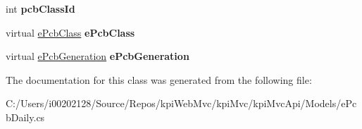 \begin{DoxyCompactItemize}
int {\bfseries pcb\+Class\+Id}
\item 
\mbox{\label{classkpi_mvc_api_1_1_models_1_1e_pcb_daily_ac1a6216b8a8446e2fcd59aa7ee06c609}} 
virtual \hyperlink{classkpi_mvc_api_1_1_models_1_1e_pcb_class}{e\+Pcb\+Class} {\bfseries e\+Pcb\+Class}
\item 
\mbox{\label{classkpi_mvc_api_1_1_models_1_1e_pcb_daily_aedba8ff244aebf2ed927ac2a49884c0e}} 
virtual \hyperlink{classkpi_mvc_api_1_1_models_1_1e_pcb_generation}{e\+Pcb\+Generation} {\bfseries e\+Pcb\+Generation}
\end{DoxyCompactItemize}


The documentation for this class was generated from the following file\+:\begin{DoxyCompactItemize}
\item 
C\+:/\+Users/i00202128/\+Source/\+Repos/kpi\+Web\+Mvc/kpi\+Mvc/kpi\+Mvc\+Api/\+Models/e\+Pcb\+Daily.\+cs\end{DoxyCompactItemize}
